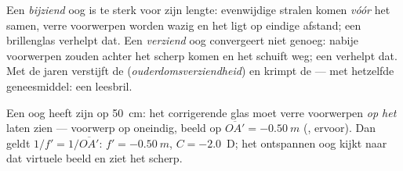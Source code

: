 \begin{definition}\label{def:g11:lenses-and-eye:defects}
Een \emph{bijziend} oog is te sterk  voor
zijn lengte: evenwijdige stralen komen \emph{vóór} het  samen,
verre voorwerpen worden wazig en het  ligt op eindige afstand;
een  brillenglas verhelpt dat. Een
\emph{verziend} oog convergeert niet genoeg: nabije
voorwerpen zouden achter het  scherp komen en het 
schuift weg; een  verhelpt dat. Met de jaren verstijft
de  (\emph{ouderdomsverziendheid}) en
krimpt de  --- met hetzelfde geneesmiddel: een leesbril.
\end{definition}

\begin{example}\label{ex:g11:lenses-and-eye:correction}
Een  oog heeft zijn  op \qty{50}{cm}: het corrigerende
glas moet verre voorwerpen \emph{op het } laten zien ---
voorwerp op oneindig, beeld op $\overline{OA'} = \qty{-0.50}{m}$
(, ervoor). Dan geldt $1/f' = 1/\overline{OA'}$:
$f' = \qty{-0.50}{m}$, $C = -2.0$~D; het ontspannen oog kijkt naar dat
virtuele beeld en ziet het scherp.
\end{example}

